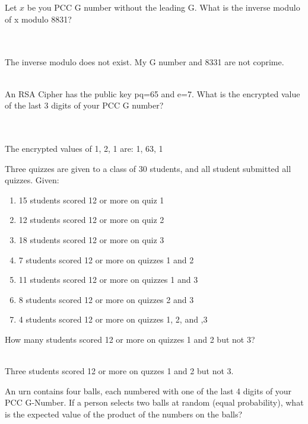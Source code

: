 \documentclass[10pt,letterpaper, cm]{hmcpset}
\begin{document}
\begin{problem}[8]
  Let $x$ be you PCC G number without the leading G. What is the inverse modulo of
  x modulo 8831?
\end{problem}\\
\\
The inverse modulo does not exist. My G number and 8331 are not coprime.\\
\\
\begin{problem}[9]
  An RSA Cipher has the public key pq=65 and e=7. What is the encrypted value of the
  last 3 digits of your PCC G number?
\end{problem}\\
\\
The encrypted values of 1, 2, 1 are:
1, 63, 1
\\

\begin{problem}[10]
  Three quizzes are given to a class of 30 students, and all student submitted all quizzes.
  Given:\\
  \begin{enumerate}[-]
    \item 15 students scored 12 or more on quiz 1
    \item 12 students scored 12 or more on quiz 2
    \item 18 students scored 12 or more on quiz 3
    \item 7 students scored 12 or more on quizzes 1 and 2
    \item 11 students scored 12 or more on quizzes 1 and 3
    \item 8 students scored 12 or more on quizzes 2 and 3
    \item 4 students scored 12 or more on quizzes 1, 2, and ,3
  \end{enumerate}
  How many students scored 12 or more on quizzes 1 and 2 but not 3?
\end{problem}\\

Three students scored 12 or more on quzzes 1 and 2 but not 3.


\begin{problem}[11]
  An urn contains four balls, each numbered with one of the last 4 digits
  of your PCC G-Number. If a person selects two balls at random (equal
  probability), what is the expected value of the product of the numbers on
  the balls?
\end{problem}\\
\end{document}

